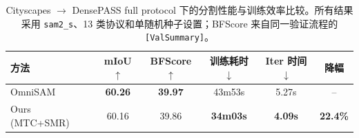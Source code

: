 \begin{table}[t]
  \centering
  \small
  \setlength{\tabcolsep}{4pt}
  \renewcommand{\arraystretch}{1.08}
  \caption{Cityscapes $\rightarrow$ DensePASS full protocol 下的分割性能与训练效率比较。所有结果采用 \texttt{sam2\_s}、13 类协议和单随机种子设置；BFScore 来自同一验证流程的 \texttt{[ValSummary]}。}
  \label{tab:main_results}
  \begin{tabular}{lccccc}
    \toprule
    方法 & mIoU$\uparrow$ & BFScore$\uparrow$ & 训练耗时$\downarrow$ & Iter 时间$\downarrow$ & 降幅 \\
    \midrule
    OmniSAM & \textbf{60.26} & \textbf{39.97} & 43m53s & 5.27s & -- \\
    Ours (MTC+SMR) & 60.16 & 39.86 & \textbf{34m03s} & \textbf{4.09s} & \textbf{22.4\%} \\
    \bottomrule
  \end{tabular}
\end{table}
